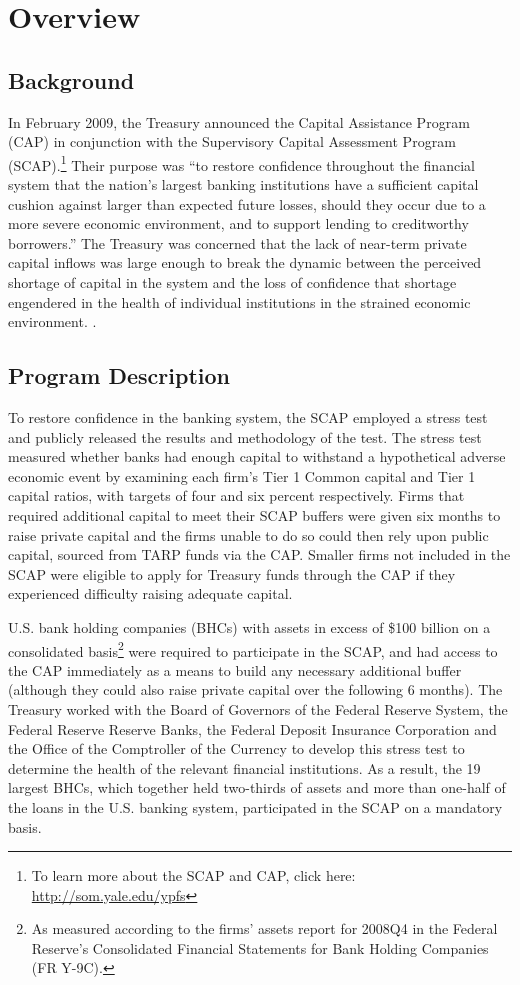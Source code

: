 \documentclass[12pt]{article}
\begin{document}
\section{Overview}

\subsection{Background}

In February 2009, the Treasury announced the Capital Assistance Program
(CAP) in conjunction with the Supervisory Capital Assessment Program
(SCAP).\footnote{To learn more about the SCAP and CAP, click here: \url{http://som.yale.edu/ypfs}} Their purpose was ``to restore confidence throughout the
financial system that the nation's largest banking institutions have a
sufficient capital cushion against larger than expected future losses,
should they occur due to a more severe economic environment, and to
support lending to creditworthy borrowers.'' The Treasury was concerned that the lack of near-term private capital inflows was large enough to
break the dynamic between the perceived shortage of capital in the
system and the loss of confidence that shortage engendered in the health
of individual institutions in the strained economic environment.
\citep{Term}.

\subsection{Program Description}

To restore confidence in the banking system, the SCAP employed a stress test and publicly
released the results and methodology of the test. The stress test measured whether banks had enough capital to withstand a hypothetical adverse economic event by examining each firm's Tier 1 Common capital and Tier 1 capital ratios, with targets of four and six percent respectively. Firms that required
additional capital to meet their SCAP buffers were given six months to
raise private capital and the firms unable to do so could then rely upon
public capital, sourced from TARP funds via the CAP. Smaller firms not
included in the SCAP were eligible to apply for Treasury funds through
the CAP if they experienced difficulty raising adequate capital.

U.S. bank holding companies (BHCs) with assets in excess of \$100
billion on a consolidated basis\footnote{As measured according to the
  firms' assets report for 2008Q4 in the Federal Reserve's Consolidated
  Financial Statements for Bank Holding Companies (FR Y-9C).} were
required to participate in the
SCAP, and had access to the CAP immediately as a means to build any
necessary additional buffer (although they could also raise private capital
over the following 6 months). The Treasury worked with the Board of Governors of the Federal Reserve System, the Federal Reserve Reserve Banks, the Federal Deposit Insurance Corporation and the Office of the Comptroller of the Currency to develop this stress test to determine the health of the
relevant financial institutions. As a result, the 19 largest BHCs, which
together held two-thirds of assets and more than one-half of the loans
in the U.S. banking system, participated in the SCAP on a mandatory
basis.\citep{OFS}
\end{document}

